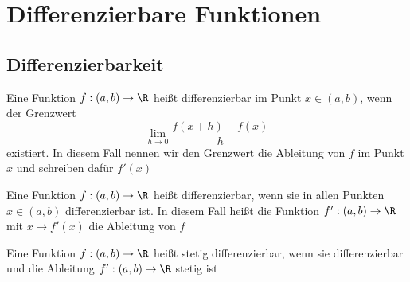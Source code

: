 \section{Differenzierbare Funktionen}
\subsection{Differenzierbarkeit}
		\begin{Definition} 
			Eine Funktion $f: (a, b)\to \R$ heißt differenzierbar im Punkt $x\in (a, b)$, wenn der Grenzwert
			$$
				\lim_{h\to 0}\frac{f(x+h)-f(x)}{h}
			$$
			existiert. In diesem Fall nennen wir den Grenzwert die Ableitung von $f$ im Punkt $x$ und schreiben dafür $f'(x)$ 
		\end{Definition}
		\begin{Definition} [ Differenzierbar]
			Eine Funktion $f: (a, b)\to \R$ heißt differenzierbar, wenn sie in allen Punkten $x\in(a, b)$ differenzierbar ist. In diesem Fall heißt die Funktion $f': (a, b) \to \R$ mit $x\mapsto f'(x)$ die Ableitung von $f$
		\end{Definition}
		\begin{Definition} 
			Eine Funktion $f: (a, b)\to \R$ heißt stetig differenzierbar, wenn sie differenzierbar und die Ableitung $f': (a, b)\to\R$ stetig ist
		\end{Definition}
